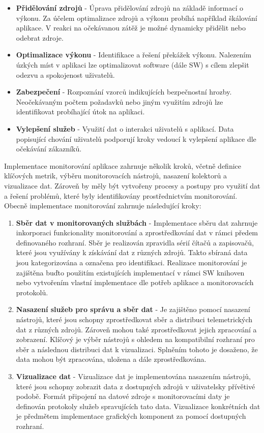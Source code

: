 \begin{itemize}
    \item \textbf{Přidělování zdrojů} - Úprava přidělování zdrojů na základě informací o výkonu. Za účelem optimalizace zdrojů a výkonu probíhá například škálování aplikace. V reakci na očekávanou zátěž je možné dynamicky přidělit nebo odebrat zdroje.
    \item \textbf{Optimalizace výkonu} - Identifikace a řešení překážek výkonu. Nalezením úzkých míst v aplikaci lze optimalizovat software (dále SW) s cílem zlepšit odezvu a spokojenost uživatelů.
    \item \textbf{Zabezpečení} - Rozpoznání vzorců indikujících bezpečnostní hrozby. Neočekávaným počtem požadavků nebo jiným využitím zdrojů lze identifikovat probíhající útok na aplikaci.
    \item \textbf{Vylepšení služeb} - Využití dat o interakci uživatelů s aplikací. Data popisující chování uživatelů podporují kroky vedoucí k vylepšení aplikace dle očekávání zákazníků.
\end{itemize}


Implementace monitorování aplikace zahrnuje několik kroků, včetně definice klíčových metrik, výběru monitorovacích nástrojů, nasazení kolektorů a vizualizace dat. Zároveň by měly být vytvořeny procesy a postupy pro využití dat a řešení problémů, které byly identifikovány prostřednictvím monitorování. \cite{Blanco2023} Obecně implementace monitorování zahrnuje následující kroky:

\begin{enumerate}
    \item \textbf{Sběr dat v monitorovaných službách} - Implementace sběru dat zahrnuje inkorporaci funkcionality monitorování a zprostředkování dat v rámci předem definovaného rozhraní. Sběr je realizován zpravidla sérií čítačů a zapisovačů, které jsou využívány k získávání dat z různých zdrojů. Takto sbíraná data jsou kategorizována a označena pro identifikaci. Realizace monitorování je zajištěna buďto použitím existujících implementací v rámci SW knihoven nebo vytvořením vlastní implementace dle potřeb aplikace a monitorovacích protokolů.
    \item \textbf{Nasazení služeb pro správu a sběr dat} - Je zajištěno pomocí nasazení nástrojů, které jsou schopny zprostředkovat sběr a distribuci telemetrických dat z různých zdrojů. Zároveň mohou také zprostředkovat jejich zpracování a zobrazení. Klíčový je výběr nástrojů s ohledem na kompatibilní rozhraní pro sběr a následnou distribuci dat k vizualizaci. Splněním tohoto je dosaženo, že data mohou být zpracována, uložena a dále zprostředkována.
    \item \textbf{Vizualizace dat} - Vizualizace dat je implementována nasazením nástrojů, které jsou schopny zobrazit data z dostupných zdrojů v uživatelsky přívětivé podobě. Formát připojení na datové zdroje s monitorovacími daty je definován protokoly služeb spravujících tato data. Vizualizace konkrétních dat je předmětem implementace grafických komponent za pomocí dostupných rozhraní.
\end{enumerate}

